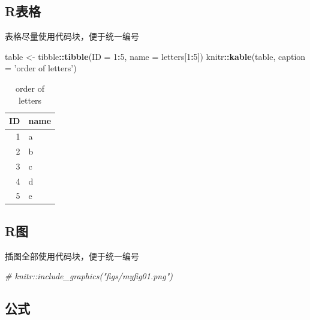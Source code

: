\documentclass[]{article}
\newenvironment{Shaded}{\begin{snugshade}}{\end{snugshade}}
\newcommand{\CommentTok}[1]{\textcolor[rgb]{0.56,0.35,0.01}{\textit{#1}}}
\newcommand{\DataTypeTok}[1]{\textcolor[rgb]{0.13,0.29,0.53}{#1}}
\newcommand{\DecValTok}[1]{\textcolor[rgb]{0.00,0.00,0.81}{#1}}
\newcommand{\KeywordTok}[1]{\textcolor[rgb]{0.13,0.29,0.53}{\textbf{#1}}}
\newcommand{\NormalTok}[1]{#1}
\newcommand{\OperatorTok}[1]{\textcolor[rgb]{0.81,0.36,0.00}{\textbf{#1}}}
\newcommand{\StringTok}[1]{\textcolor[rgb]{0.31,0.60,0.02}{#1}}
\begin{document}
\hypertarget{r-1}{%
\subsection{R表格}\label{r-1}}

表格尽量使用代码块，便于统一编号

\begin{Shaded}
\begin{Highlighting}[]
\NormalTok{table <-}\StringTok{ }\NormalTok{tibble}\OperatorTok{::}\KeywordTok{tibble}\NormalTok{(}\DataTypeTok{ID =} \DecValTok{1}\OperatorTok{:}\DecValTok{5}\NormalTok{, }\DataTypeTok{name =}\NormalTok{ letters[}\DecValTok{1}\OperatorTok{:}\DecValTok{5}\NormalTok{])}
\NormalTok{knitr}\OperatorTok{::}\KeywordTok{kable}\NormalTok{(table, }\DataTypeTok{caption =} \StringTok{'order of letters'}\NormalTok{)}
\end{Highlighting}
\end{Shaded}

\begin{table}

\caption{\label{tab:unnamed-chunk-4}order of letters}
\centering
\begin{tabular}[t]{r|l}
\hline
ID & name\\
\hline
1 & a\\
\hline
2 & b\\
\hline
3 & c\\
\hline
4 & d\\
\hline
5 & e\\
\hline
\end{tabular}
\end{table}

\hypertarget{r-2}{%
\subsection{R图}\label{r-2}}

插图全部使用代码块，便于统一编号

\begin{Shaded}
\begin{Highlighting}[]
\CommentTok{# knitr::include_graphics("figs/myfig01.png")}
\end{Highlighting}
\end{Shaded}

\hypertarget{section-23}{%
\subsection{公式}\label{section-23}}
\end{document}

